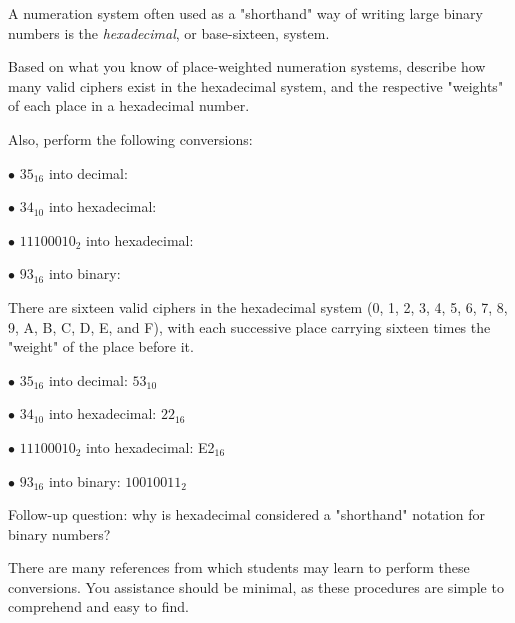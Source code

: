

A numeration system often used as a "shorthand" way of writing large binary numbers is the {\it hexadecimal}, or base-sixteen, system.

Based on what you know of place-weighted numeration systems, describe how many valid ciphers exist in the hexadecimal system, and the respective "weights" of each place in a hexadecimal number.

Also, perform the following conversions:

\medskip
\item{$\bullet$} $35_{16}$ into decimal:
\item{$\bullet$} $34_{10}$ into hexadecimal:
\item{$\bullet$} $11100010_{2}$ into hexadecimal:
\item{$\bullet$} $93_{16}$ into binary:
\medskip







There are sixteen valid ciphers in the hexadecimal system (0, 1, 2, 3, 4, 5, 6, 7, 8, 9, A, B, C, D, E, and F), with each successive place carrying sixteen times the "weight" of the place before it.

\medskip
\item{$\bullet$} $35_{16}$ into decimal: $53_{10}$
\item{$\bullet$} $34_{10}$ into hexadecimal: $22_{16}$
\item{$\bullet$} $11100010_{2}$ into hexadecimal: E2$_{16}$
\item{$\bullet$} $93_{16}$ into binary: $10010011_2$
\medskip

\vskip 10pt

Follow-up question: why is hexadecimal considered a "shorthand" notation for binary numbers?







There are many references from which students may learn to perform these conversions.  You assistance should be minimal, as these procedures are simple to comprehend and easy to find.




